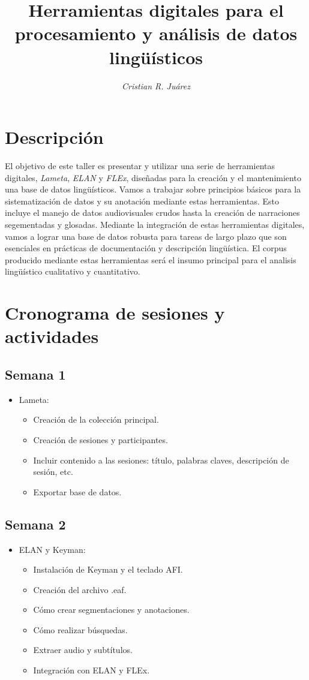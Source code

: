 \documentclass[12pt]{article}
\title{\textbf{Herramientas digitales para el procesamiento y análisis de datos lingüísticos}}
\author{\textit{Cristian R. Juárez} \vspace{-3mm}}
\affil{Instituto Federal de Tecnología de Zürich\vspace{-3mm}}
\affil{\href{mailto:juarezcristianr@gmail.com}{juarezcristianr@gmail.com}}
\date{}
\begin{document}
\maketitle

\section{Descripción}
El objetivo de este taller es presentar y utilizar una serie de herramientas digitales, \textit{Lameta}, \textit{ELAN} y \textit{FLEx}, diseñadas para la creación y el mantenimiento una base de datos lingüísticos. Vamos a trabajar sobre principios básicos para la sistematización de datos y su anotación mediante estas herramientas. Esto incluye el manejo de datos audiovisuales crudos hasta la creación de narraciones segementadas y glosadas. Mediante la integración de estas herramientas digitales, vamos a lograr una base de datos robusta para tareas de largo plazo que son esenciales en prácticas de documentación y descripción lingüística. El corpus producido mediante estas herramientas será el insumo principal para el analisis lingüístico cualitativo y cuantitativo.

\section{Cronograma de sesiones y actividades}

\subsection*{Semana 1}
\begin{itemize}
\item Lameta:
\begin{itemize}
\item Creación de la colección principal. 
\item Creación de sesiones y participantes.
\item Incluir contenido a las sesiones: título, palabras claves, descripción de sesión, etc. 
\item Exportar base de datos.
\end{itemize}
\end{itemize}

\subsection*{Semana 2}
\begin{itemize}
\item ELAN y Keyman:
\begin{itemize}
\item Instalación de Keyman y el teclado AFI.
\item Creación del archivo .eaf.
\item Cómo crear segmentaciones y anotaciones.
\item Cómo realizar búsquedas.
\item Extraer audio y subtítulos.
\item Integración con ELAN y FLEx.
\end{itemize}
\end{itemize}
\end{document}
